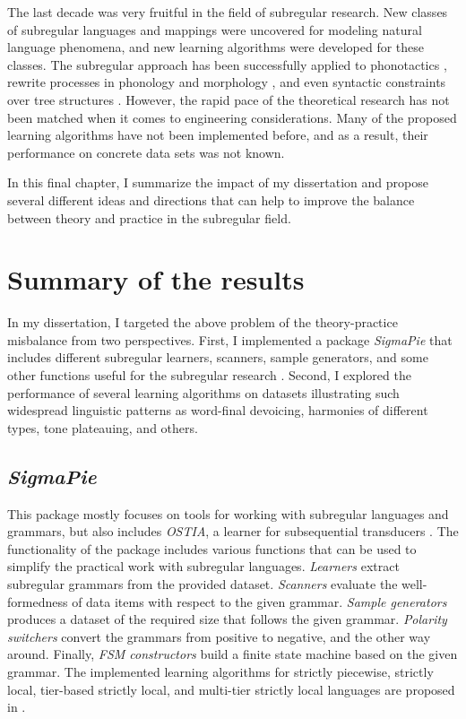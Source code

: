The last decade was very fruitful in the field of subregular research.
New classes of subregular languages and mappings were uncovered for modeling natural language phenomena, and new learning algorithms were developed for these classes.
The subregular approach has been successfully applied to phonotactics \citep{Heinz10ldp}, rewrite processes in phonology and morphology \citep{Chandlee2014}, and even syntactic constraints over tree structures \citep{Graf18CLS}.
However, the rapid pace of the theoretical research has not been matched when it comes to engineering considerations.
Many of the proposed learning algorithms have not been implemented before, and as a result, their performance on concrete data sets was not known.

In this final chapter, I summarize the impact of my dissertation and propose several different ideas and directions that can help to improve the balance between theory and practice in the subregular field.



\section{Summary of the results}

In my dissertation, I targeted the above problem of the theory-practice misbalance from two perspectives.
First, I implemented a package \emph{SigmaPie} \href{https://pypi.org/project/SigmaPie/}{\faCube} that includes different subregular learners, scanners, sample generators, and some other functions useful for the subregular research \citep{sigmapie}.
Second, I explored the performance of several learning algorithms on datasets illustrating such widespread linguistic patterns as word-final devoicing, harmonies of different types, tone plateauing, and others.

\subsection{\emph{SigmaPie} \href{https://pypi.org/project/SigmaPie/}{\faCube}}

This package mostly focuses on tools for working with subregular languages and grammars, but also includes \emph{OSTIA}, a learner for subsequential transducers \citep{OncinaEtAl1993,DeLaHiguera2010}.
The functionality of the package includes various functions that can be used to simplify the practical work with subregular languages.
\emph{Learners} extract subregular grammars from the provided dataset.
\emph{Scanners} evaluate the well-formedness of data items with respect to the given grammar.
\emph{Sample generators} produces a dataset of the required size that follows the given grammar.
\emph{Polarity switchers} convert the grammars from positive to negative, and the other way around.
Finally, \emph{FSM constructors} build a finite state machine based on the given grammar.
The implemented learning algorithms for strictly piecewise, strictly local, tier-based strictly local, and multi-tier strictly local languages are proposed in \citep{Heinz-2010-SEL,JardineMcMullin2017,McMullinAksenovaDeSanto2019}.


